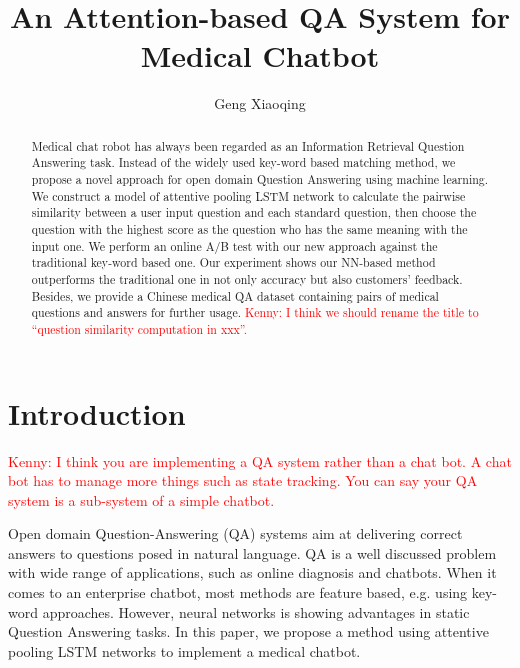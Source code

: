 \documentclass[a4paper,10pt]{article}
\title{An Attention-based QA System for Medical Chatbot}
\author{Geng Xiaoqing}
\newcommand{\KZ}[1]{\textcolor{red}{Kenny: #1}}
\begin{document}
\maketitle

\begin{abstract}
Medical chat robot has always been regarded as an Information Retrieval Question Answering task. Instead of the widely used key-word based matching method, we propose a novel approach for open domain Question Answering using machine learning. We construct a model of attentive pooling LSTM network to calculate the pairwise similarity between a user input question and each standard question, then choose the question with the highest score as the question who has the same meaning with the input one. We perform an online A/B test with our new approach against the traditional key-word based one. Our experiment shows our NN-based method outperforms the traditional one in not only accuracy but also customers' feedback. Besides, we provide a Chinese medical QA dataset containing pairs of medical questions and answers for further usage. \KZ{I think we should rename
the title to ``question similarity computation in xxx''.}
\end{abstract}

\section{Introduction}
\KZ{I think you are implementing a QA system rather than a chat bot. A chat
bot has to manage more things such as state tracking. You can say your QA system
is a sub-system of a simple chatbot.} 

Open domain Question-Answering (QA) systems aim at delivering correct answers to questions posed in natural language. \cite{LearningToAnswerQuestions} QA is a well discussed problem with wide range of applications, such as online diagnosis and chatbots. When it comes to an enterprise chatbot, most methods are feature based, e.g. using key-word approaches. However, neural networks is showing advantages in static Question Answering tasks. In this paper, we propose a method using attentive pooling LSTM networks to implement a medical chatbot.
\end{document}
